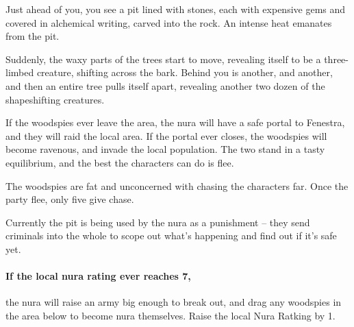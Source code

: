 \begin{multicols}{2}
\begin{boxtext}

	Just ahead of you, you see a pit lined with stones, each with expensive gems and covered in alchemical writing, carved into the rock.
	An intense heat emanates from the pit.

	Suddenly, the waxy parts of the trees start to move, revealing itself to be a three-limbed creature, shifting across the bark.  Behind you is another, and another, and then an entire tree pulls itself apart, revealing another two dozen of the shapeshifting creatures.

\end{boxtext}

If the woodspies ever leave the area, the nura will have a safe portal to Fenestra, and they will raid the local area.
If the portal ever closes, the woodspies will become ravenous, and invade the local population.
The two stand in a tasty equilibrium, and the best the characters can do is flee.

The woodspies are fat and unconcerned with chasing the characters far.  Once the party flee, only five give chase.


Currently the pit is being used by the nura as a punishment -- they send criminals into the whole to scope out what's happening and find out if it's safe yet.

\paragraph{If the local nura rating ever reaches 7,}
the nura will raise an army big enough to break out, and drag any woodspies in the area below to become nura themselves.
Raise the local Nura Ratking by 1.


\stopcontents[sq]

\end{multicols}

\stopcontents[Forest]

